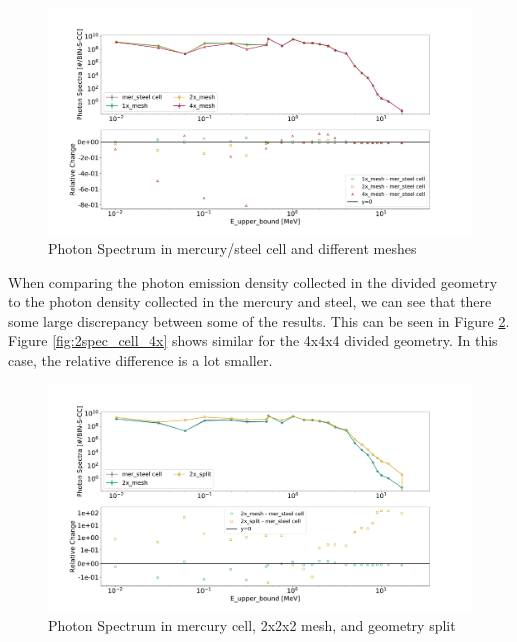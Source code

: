 \begin{figure}[H]
 \centering
 \includegraphics[scale=0.4,trim={2cm 0.5cm 3cm 2cm},clip]{../figs/toy_p2/spec_VPII_1x_2x_4x.pdf}
 \caption{Photon Spectrum in mercury/steel cell and different meshes}
 \label{fig:2spec_cell_1x_2x_4x}
\end{figure}
%
When comparing the photon emission density collected in the divided geometry
to the photon density collected in the mercury and steel, we can see that
there some large discrepancy between some of the results. This can be seen in
Figure \ref{fig:2spec_cell_2x}. Figure \ref{fig:2spec_cell_4x} shows similar
for the 4x4x4 divided geometry. In this case, the relative difference is a lot
smaller.
%
\begin{figure}[H]
 \centering
 \includegraphics[scale=0.4,trim={2cm 0.5cm 3cm 2cm},clip]{../figs/toy_p2/spec_VPII_2x.pdf}
 \caption{Photon Spectrum in mercury cell, 2x2x2 mesh, and geometry split}
 \label{fig:2spec_cell_2x}
\end{figure}
%
